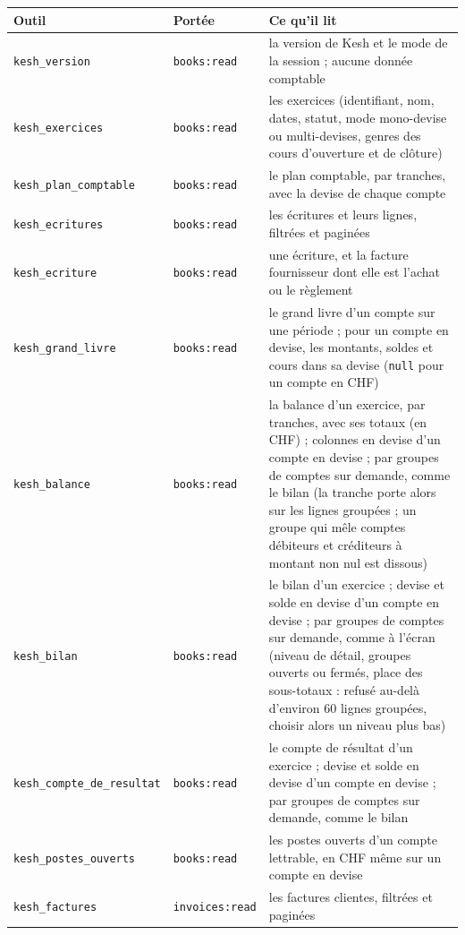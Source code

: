 \documentclass[a4paper,11pt,oneside]{article}
\begin{document}
\begin{center}
\small
\begin{tabular}{p{4.6cm}p{2.4cm}p{7.2cm}}
\textbf{Outil} & \textbf{Portée} & \textbf{Ce qu'il lit} \\
\hline
\texttt{kesh\_version} & \texttt{books:read} & la version de Kesh et le mode de la session ; aucune donnée comptable \\
\texttt{kesh\_exercices} & \texttt{books:read} & les exercices (identifiant, nom, dates, statut, mode mono-devise ou multi-devises, genres des cours d'ouverture et de clôture) \\
\texttt{kesh\_plan\_comptable} & \texttt{books:read} & le plan comptable, par tranches, avec la devise de chaque compte \\
\texttt{kesh\_ecritures} & \texttt{books:read} & les écritures et leurs lignes, filtrées et paginées \\
\texttt{kesh\_ecriture} & \texttt{books:read} & une écriture, et la facture fournisseur dont elle est l'achat ou le règlement \\
\texttt{kesh\_grand\_livre} & \texttt{books:read} & le grand livre d'un compte sur une période ; pour un compte en devise, les montants, soldes et cours dans sa devise (\texttt{null} pour un compte en CHF) \\
\texttt{kesh\_balance} & \texttt{books:read} & la balance d'un exercice, par tranches, avec ses totaux (en CHF) ; colonnes en devise d'un compte en devise ; par groupes de comptes sur demande, comme le bilan (la tranche porte alors sur les lignes groupées ; un groupe qui mêle comptes débiteurs et créditeurs à montant non nul est dissous) \\
\texttt{kesh\_bilan} & \texttt{books:read} & le bilan d'un exercice ; devise et solde en devise d'un compte en devise ; par groupes de comptes sur demande, comme à l'écran (niveau de détail, groupes ouverts ou fermés, place des sous-totaux : refusé au-delà d'environ 60 lignes groupées, choisir alors un niveau plus bas) \\
\texttt{kesh\_compte\_de\_resultat} & \texttt{books:read} & le compte de résultat d'un exercice ; devise et solde en devise d'un compte en devise ; par groupes de comptes sur demande, comme le bilan \\
\texttt{kesh\_postes\_ouverts} & \texttt{books:read} & les postes ouverts d'un compte lettrable, en CHF même sur un compte en devise \\
\texttt{kesh\_factures} & \texttt{invoices:read} & les factures clientes, filtrées et paginées \\

\end{tabular}
\end{center}
\end{document}
